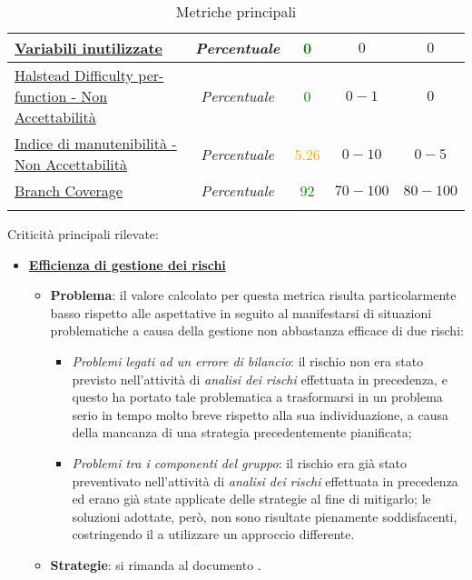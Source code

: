 \begin{longtable}{|>{\centering}m{5cm}|c|c|c|c|}
\hyperref[variabInutilizz]{Variabili inutilizzate} & \textit{Percentuale} & \textcolor{Green}{0} & $0$ & $0$\\ \hline
\hyperref[halDiffNA]{Halstead Difficulty per-function - Non Accettabilità} & \textit{Percentuale} & \textcolor{Green}{0} & $0 - 1$ & $0$\\ \hline
\hyperref[indManNA]{Indice di manutenibilità - Non Accettabilità} & \textit{Percentuale} & \textcolor{Orange}{5.26} & $0 - 10$ & $0 - 5$\\ \hline
\hyperref[coperturaTest]{Branch Coverage} & \textit{Percentuale} & \textcolor{Green}{92} & $70 - 100$ & $80 - 100$\\ \hline
\caption[Metriche principali]{Metriche principali}
\end{longtable}
\FloatBarrier
Criticità principali rilevate:
\begin{itemize}
\item \hyperref[effGestRischi]{\textbf{Efficienza di gestione dei rischi}}
\begin{itemize}
\item \textbf{Problema}: il valore calcolato per questa metrica risulta particolarmente basso rispetto alle aspettative in seguito al manifestarsi di situazioni problematiche a causa della gestione non abbastanza efficace di due rischi:
\begin{itemize}
\item \textit{Problemi legati ad un errore di bilancio}: il rischio non era stato previsto nell'attività di \textit{analisi dei rischi} effettuata in precedenza, e questo ha portato tale problematica a trasformarsi in un problema serio in tempo molto breve rispetto alla sua individuazione, a causa della mancanza di una strategia precedentemente pianificata;
\item \textit{Problemi tra i componenti del gruppo}: il rischio era già stato preventivato nell'attività di \textit{analisi dei rischi} effettuata in precedenza ed erano già state applicate delle strategie al fine di mitigarlo; le soluzioni adottate, però, non sono risultate pienamente soddisfacenti, costringendo il  a utilizzare un approccio differente.
\end{itemize}
\item \textbf{Strategie}: si rimanda al documento \pianoDiProgetto.
\end{itemize}
\end{itemize}
